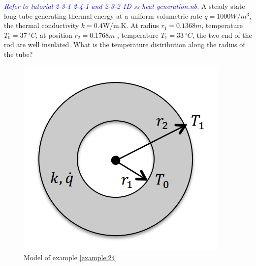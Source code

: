 \begin{example}
\label{example:24}
\textcolor{blue} {\emph{Refer to tutorial 2-3-1 2-4-1 and 2-3-2 1D ss heat generation.nb.}}
A steady state long tube generating thermal energy at a uniform volumetric rate
$\dot{q}=1000W/m^3$, the thermal conductivity $k=0.4$W/m.K.
At radius $r_1=0.1368m$, temperature $T_0=37~^\circ C$, at position $r_2=0.1768m$
, temperature $T_1=33~^\circ C$, the two end of the rod are well insulated.
What is the temperature distribution along the radius of the tube?
\begin{figure}[H]
  \centering
    \includegraphics[scale=0.6]{figures/ch2/8}
    \caption{Model of example \ref{example:24}}
    \label{fig:2:8}
\end{figure}
\end{example}

